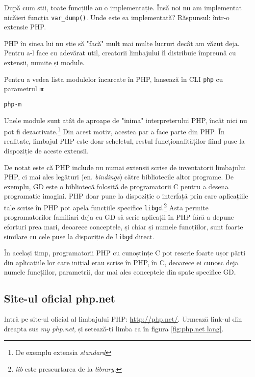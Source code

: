 După cum știi, toate funcțiile au o implementație. Însă
noi nu am implementat nicăieri funcția \texttt{var\_dump()}. Unde
este ea implementată? Răspunsul: într-o extensie PHP.

PHP în sinea lui nu știe să "facă" mult mai multe lucruri decât
am văzut deja. Pentru a-l face cu adevărat util, creatorii
limbajului îl distribuie împreună cu extensii, numite și module.

Pentru a vedea lista modulelor încarcate în PHP, lansează
în CLI \texttt{php} cu parametrul \texttt{\-m}:
\begin{alltt}
php -m\Return
\end{alltt}
Unele module sunt atât de aproape de "inima" interpreterului
PHP, încât nici nu pot fi dezactivate.\footnote{De exemplu
extensia \textit{standard}} Din acest motiv, acestea
par a face parte din PHP. În realitate, limbajul PHP
este doar scheletul, restul funcționalităților
fiind puse la dispoziție de aceste extensii.

De notat este că PHP include nu numai extensii scrise
de inventatorii limbajului PHP, ci mai ales legături
(en. \textsl{bindings})
către bibliotecile altor programe. De exemplu,
GD este o bibliotecă folosită de programatorii C
pentru a desena programatic imagini. PHP doar
pune la dispoziție o interfață prin care aplicațiile
tale scrise în PHP pot apela funcțiile specifice \texttt{libgd}.\footnote{\textit{lib}
este prescurtarea de la \textit{library}.}
Asta permite programatorilor familiari deja cu GD
să scrie aplicații în PHP fără a depune eforturi
prea mari, deoarece conceptele, și chiar și numele funcțiilor,
sunt foarte similare cu cele puse la dispoziție de \texttt{libgd}
direct.

În același timp, programatorii PHP cu cunoștințe C
pot rescrie foarte ușor părți din aplicațiile lor
care inițial erau scrise în PHP, în C, deoarece
ei cunosc deja numele funcțiilor, parametrii,
dar mai ales conceptele din spate specifice 
GD.


\subsection{Site-ul oficial php.net}
Intră pe site-ul oficial al limbajului PHP: \url{http://php.net/}.
Urmează link-ul din dreapta sus \textit{my php.net}, și setează-ți
limba ca în figura \ref{fig:php.net lang}.


